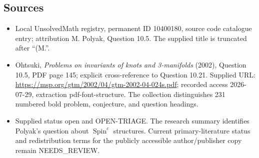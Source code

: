 \documentclass[11pt]{article}
\begin{document}
\subsection{Sources}
\begin{itemize}
\item Local UnsolvedMath registry, permanent ID 10400180, source code catalogue entry; attribution M. Polyak, Question 10.5. The supplied title is truncated after ``(M.''.
\item Ohtsuki, \emph{Problems on invariants of knots and 3-manifolds} (2002), Question 10.5, PDF page 145; explicit cross-reference to Question 10.21. Supplied URL: \url{https://msp.org/gtm/2002/04/gtm-2002-04-024s.pdf}; recorded access 2026-07-29, extraction pdf-font-structure. The collection distinguishes 231 numbered bold problem, conjecture, and question headings.
\item Supplied status open and OPEN-TRIAGE. The research summary identifies Polyak's question about \(\operatorname{Spin}^c\) structures. Current primary-literature status and redistribution terms for the publicly accessible author/publisher copy remain NEEDS\_REVIEW.
\end{itemize}
\end{document}
